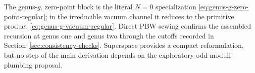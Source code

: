 \documentclass[11pt]{article}
\begin{document}
The genus-\(g\), zero-point block is the literal \(N=0\) specialization
\eqref{eq:genus-g-zero-point-regular}; in the irreducible vacuum channel it
reduces to the primitive product \eqref{eq:genus-g-vacuum-regular}.  Direct
PBW sewing confirms the assembled recursion at genus one and genus two
through the cutoffs recorded in Section~\ref{sec:consistency-checks}.
Superspace provides a compact reformulation, but no step of the main
derivation depends on the exploratory odd-moduli plumbing proposal.



\end{document}
